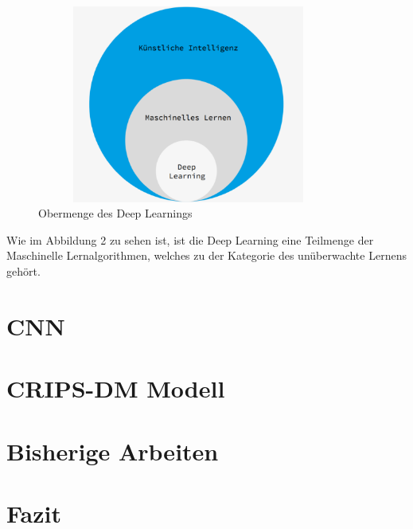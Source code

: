 \documentclass[12pt,titlepage]{article}
\begin{document}
\begin{figure}[ht]
	\centering
  \includegraphics[width=10cm,height=6.5cm]{Abbildung_DeepLearning_1.png}
	\caption{Obermenge des Deep Learnings}
	\label{fig2}
\end{figure}

Wie im Abbildung 2 zu sehen ist, ist die Deep Learning eine Teilmenge der Maschinelle Lernalgorithmen, welches zu der Kategorie des unüberwachte Lernens gehört.

\section{CNN}

\section{CRIPS-DM Modell}

\section{Bisherige Arbeiten}

\section{Fazit}
\end{document}

